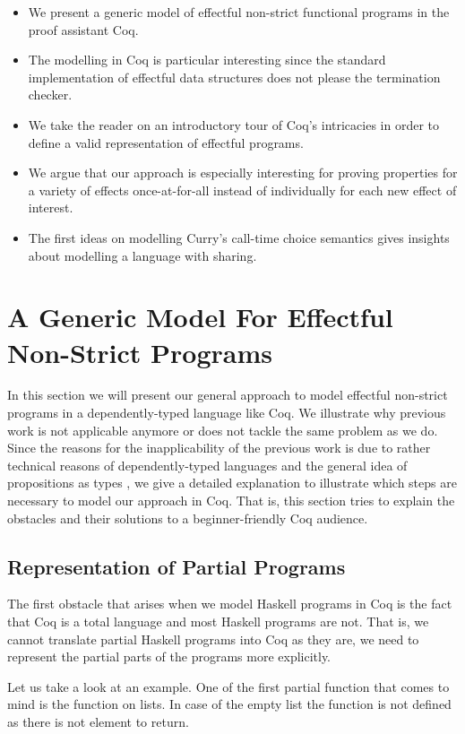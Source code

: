 \begin{itemize}
\item We present a generic model of effectful non-strict functional
  programs in the proof assistant Coq.
\item The modelling in Coq is particular interesting since the
  standard implementation of effectful data structures does not please
  the termination checker.
\item We take the reader on an introductory tour of Coq's intricacies in
order to define a valid representation of effectful programs.
\item We argue that our approach is especially interesting for proving
  properties for a variety of effects once-at-for-all instead of
  individually for each new effect of interest.
\item The first ideas on modelling Curry's call-time choice semantics
  gives insights about modelling a language with sharing.
\end{itemize}
 
\section{A Generic Model For Effectful Non-Strict Programs}

In this section we will present our general approach to model
effectful non-strict programs in a dependently-typed language like
Coq.
We illustrate why previous work is not applicable anymore or does not
tackle the same problem as we do.
Since the reasons for the inapplicability of the previous work is due
to rather technical reasons of dependently-typed languages and the
general idea of propositions as types \citep{wadler2015propositions},
we give a detailed explanation to illustrate which steps are necessary
to model our approach in Coq.
That is, this section tries to explain the obstacles and their
solutions to a beginner-friendly Coq audience.

\subsection{Representation of Partial Programs}
The first obstacle that arises when we model Haskell programs in Coq
is the fact that Coq is a total language and most Haskell programs are
not.
That is, we cannot translate partial Haskell programs into Coq as they
are, we need to represent the partial parts of the programs more
explicitly.

Let us take a look at an example.
One of the first partial function that comes to mind is the  function on lists.
In case of the empty list the function is not defined as there is not element to return.

